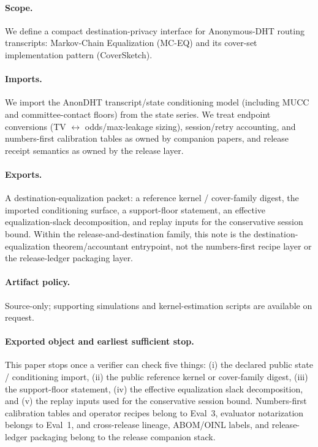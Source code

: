 \documentclass[11pt]{article}
\begin{document}
\paragraph{Scope.}
We define a compact destination-privacy interface for Anonymous-DHT routing transcripts: Markov-Chain Equalization (MC-EQ) and its cover-set implementation pattern (CoverSketch).

\paragraph{Imports.}
We import the AnonDHT transcript/state conditioning model (including MUCC and committee-contact floors) from the state series.\cite{series:state2}
We treat endpoint conversions (TV $\leftrightarrow$ odds/max-leakage sizing), session/retry accounting, and numbers-first calibration tables as owned by companion papers, and release receipt semantics as owned by the release layer.\cite{series:endpointbridge,series:schedcompiler,series:eval3,series:release}

\paragraph{Exports.}
A destination-equalization packet: a reference kernel / cover-family digest, the imported conditioning surface, a support-floor statement, an effective equalization-slack decomposition, and replay inputs for the conservative session bound. Within the release-and-destination family, this note is the destination-equalization theorem/accountant entrypoint, not the numbers-first recipe layer or the release-ledger packaging layer.

\paragraph{Artifact policy.}
Source-only; supporting simulations and kernel-estimation scripts are available on request.\cite{series:artifactpolicy}

\paragraph{Exported object and earliest sufficient stop.}
This paper stops once a verifier can check five things: (i) the declared public state / conditioning import, (ii) the public reference kernel or cover-family digest, (iii) the support-floor statement, (iv) the effective equalization slack decomposition, and (v) the replay inputs used for the conservative session bound. Numbers-first calibration tables and operator recipes belong to Eval~3, evaluator notarization belongs to Eval~1, and cross-release lineage, ABOM/OINL labels, and release-ledger packaging belong to the release companion stack.\cite{series:eval3,series:eval1,series:abom,series:release}
\end{document}

